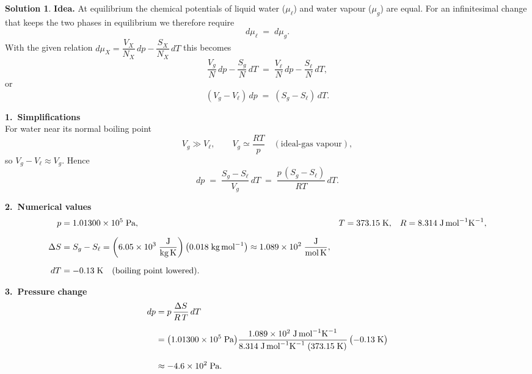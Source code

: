 \documentclass[12pt]{article}
\theoremstyle{definition} %
\newtheorem{solution}{Solution}
\theoremstyle{plain} %
\begin{document}
          \begin{solution}
            \textbf{Idea.}  
            At equilibrium the chemical potentials of liquid water (\( \mu_\ell \)) and
            water vapour (\( \mu_g \)) are equal.  For an infinitesimal change that keeps
            the two phases in equilibrium we therefore require
            \[
              d\mu_\ell \;=\; d\mu_g .
            \]
            With the given relation
            \(
              d\mu_X = \dfrac{V_X}{N_X}\,dp - \dfrac{S_X}{N_X}\,dT
            \)
            this becomes
            \[
              \frac{V_g}{N}\,dp - \frac{S_g}{N}\,dT
              \;=\;
              \frac{V_\ell}{N}\,dp - \frac{S_\ell}{N}\,dT ,
            \]
            or
            \[
              (V_g - V_\ell)\,dp \;=\; (S_g - S_\ell)\,dT .
            \]
            
            \medskip
            \textbf{1.\  Simplifications}\\
            For water near its normal boiling point
            \[
              V_g \gg V_\ell ,
            \qquad
              V_g \simeq \frac{RT}{p} \quad (\text{ideal‑gas vapour}),
            \]
            so \(V_g - V_\ell \approx V_g\).
            Hence
            \[
              dp \;=\; \frac{S_g - S_\ell}{V_g}\,dT
                    \;=\; \frac{p\,(S_g - S_\ell)}{RT}\,dT .
            \]
            
            \medskip
            \textbf{2.\  Numerical values}\\
            \begin{align*}
            p &= 1.01300\times10^{5}\;\text{Pa}, &
            T &= 373.15\;\text{K}, &
            R &= 8.314\;\text{J\,mol}^{-1}\text{K}^{-1},\\[6pt]
            \Delta S &= S_g - S_\ell
                     = \left(6.05\times10^{3}\;\frac{\text{J}}{\text{kg\,K}}\right)
                       \bigl(0.018\;\text{kg\,mol}^{-1}\bigr)
                     \approx 1.089\times10^{2}\;\frac{\text{J}}{\text{mol\,K}},\\[6pt]
            dT &= -0.13\;\text{K}\quad(\text{boiling point lowered}).
            \end{align*}
            
            \medskip
            \textbf{3.\  Pressure change}\\
            \begin{align*}
            dp
              &= p\,\frac{\Delta S}{R\,T}\,dT \\[6pt]
              &= \bigl(1.01300\times10^{5}\;\text{Pa}\bigr)
                 \frac{1.089\times10^{2}\;\text{J\,mol}^{-1}\text{K}^{-1}}
                      {8.314\;\text{J\,mol}^{-1}\text{K}^{-1}\;(373.15\;\text{K})}
                 \,\bigl(-0.13\;\text{K}\bigr) \\[8pt]
              &\approx -4.6\times10^{2}\;\text{Pa}.
            \end{align*}
            

\end{solution}
\end{document}
